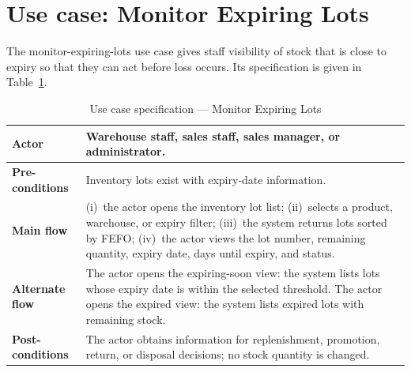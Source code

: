 \section*{Use case: Monitor Expiring Lots}
The monitor-expiring-lots use case gives staff visibility of stock that is close
to expiry so that they can act before loss occurs. Its specification is given in
Table~\ref{tab:uc-explot}.
\begin{table}[H]\centering
\caption{Use case specification --- Monitor Expiring Lots}
\label{tab:uc-explot}
\begin{tabular}{|p{3cm}|p{11cm}|}
\hline
\textbf{Actor} & Warehouse staff, sales staff, sales manager, or administrator. \\ \hline
\textbf{Pre-conditions} & Inventory lots exist with expiry-date information. \\ \hline
\textbf{Main flow} & (i)~the actor opens the inventory lot list; (ii)~selects a product, warehouse, or expiry filter; (iii)~the system returns lots sorted by FEFO; (iv)~the actor views the lot number, remaining quantity, expiry date, days until expiry, and status. \\ \hline
\textbf{Alternate flow} & The actor opens the expiring-soon view: the system lists lots whose expiry date is within the selected threshold. The actor opens the expired view: the system lists expired lots with remaining stock. \\ \hline
\textbf{Post-conditions} & The actor obtains information for replenishment, promotion, return, or disposal decisions; no stock quantity is changed. \\ \hline
\end{tabular}
\end{table}
